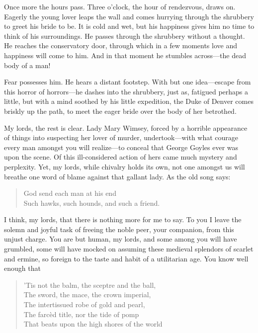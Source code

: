 \begin{dialogue}
\smallskip

Once more the hours pass. Three o'clock, the hour of rendezvous, draws on. Eagerly the young lover leaps the wall and comes hurrying through the shrubbery to greet his bride to be. It is cold and wet, but his happiness gives him no time to think of his surroundings. He passes through the shrubbery without a thought. He reaches the conservatory door, through which in a few moments love and happiness will come to him. And in that moment he stumbles across\allowbreak---\allowbreak the dead body of a man!

\smallskip

Fear possesses him. He hears a distant footstep. With but one idea\allowbreak---\allowbreak escape from this horror of horrors\allowbreak---\allowbreak he dashes into the shrubbery, just as, fatigued perhaps a little, but with a mind soothed by his little expedition, the Duke of Denver comes briskly up the path, to meet the eager bride over the body of her betrothed.

\smallskip

My lords, the rest is clear. Lady Mary Wimsey, forced by a horrible appearance of things into suspecting her lover of murder, undertook\allowbreak---\allowbreak with what courage every man amongst you will realize\allowbreak---\allowbreak to conceal that George Goyles ever was upon the scene. Of this ill-considered action of hers came much mystery and perplexity. Yet, my lords, while chivalry holds its own, not one amongst us will breathe one word of blame against that gallant lady. As the old song says:

\begin{verse}
God send each man at his end\\
Such hawks, such hounds, and such a friend.\\
\end{verse}


I think, my lords, that there is nothing more for me to say. To you I leave the solemn and joyful task of freeing the noble peer, your companion, from this unjust charge. You are but human, my lords, and some among you will have grumbled, some will have mocked on assuming these medieval splendors of scarlet and ermine, so foreign to the taste and habit of a utilitarian age. You know well enough that

\begin{verse}
'Tis not the balm, the sceptre and the ball,\\
The sword, the mace, the crown imperial,\\
The intertissued robe of gold and pearl,\\
The farcèd title, nor the tide of pomp\\
That beats upon the high shores of the world\\
\end{verse}


\end{dialogue}
